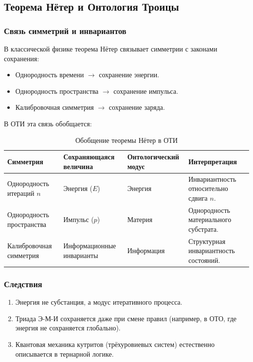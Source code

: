 \documentclass[11pt, a4paper]{article}
\begin{document}
\subsection{Теорема Нётер и Онтология Троицы}
\subsubsection*{Связь симметрий и инвариантов}
В классической физике теорема Нётер связывает симметрии с законами сохранения:
\begin{itemize}
    \item Однородность времени $\rightarrow$ сохранение энергии.
    \item Однородность пространства $\rightarrow$ сохранение импульса.
    \item Калибровочная симметрия $\rightarrow$ сохранение заряда.
\end{itemize}

В ОТИ эта связь обобщается:
\begin{table}[H]
\centering
\begin{tabular}{l l l l}
\toprule
\textbf{Симметрия} & \textbf{Сохраняющаяся величина} & \textbf{Онтологический модус} & \textbf{Интерпретация} \\
\midrule
Однородность итераций $n$ & Энергия ($E$) & Энергия & Инвариантность относительно сдвига $n$. \\
Однородность пространства & Импульс ($p$) & Материя & Однородность материального субстрата. \\
Калибровочная симметрия & Информационные инварианты & Информация & Структурная инвариантность состояний. \\
\bottomrule
\end{tabular}
\caption{Обобщение теоремы Нётер в ОТИ}
\end{table}

\subsubsection*{Следствия}
\begin{enumerate}
    \item Энергия не субстанция, а модус итеративного процесса.
    \item Триада Э-М-И сохраняется даже при смене правил (например, в ОТО, где энергия не сохраняется глобально).
    \item Квантовая механика кутритов (трёхуровиевых систем) естественно описывается в тернарной логике.
\end{enumerate}
\end{document}
